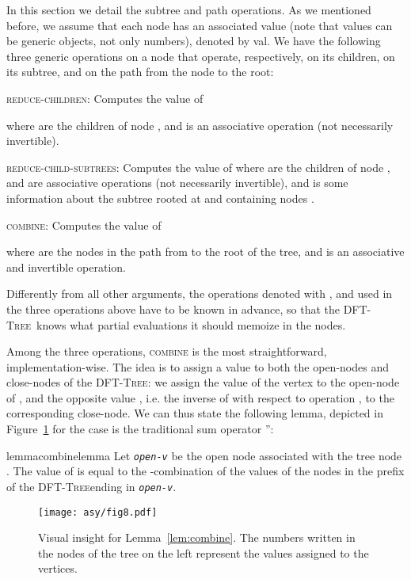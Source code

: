 \documentclass[a4paper,USenglish]{lipics}
\newcommand{\var}[1]{\textrm{\texttt{#1}}}
\newcommand{\dft}{\textsc{DFT-Tree}}
\begin{document}
In this section we detail the subtree and path operations. As we mentioned before, we assume that each node  has an associated value (note that values can be generic objects, not only numbers), denoted by \textrm{val}. We have the following three generic operations on a node that operate, respectively, on its children, on its subtree, and on the path from the node to the root:
		\begin{compactitem}
			\item \textsc{reduce-children}: Computes the value of 
			
			where  are the children of node , and  is an associative operation (not necessarily invertible).
			\item \textsc{reduce-child-subtrees}: Computes the value of 
			where  are the children of node ,  and  are associative operations (not necessarily invertible), and  is some information about the subtree rooted at  and containing nodes .
			\item \textsc{combine}: Computes the value of
			
			where  are the nodes in the path from  to the root of the tree, and  is an associative and invertible operation.
		\end{compactitem}
Differently from all other arguments, the operations denoted with ,  and  used in the three operations above have to be known in advance, so that the \dft\ knows what partial evaluations it should memoize in the nodes.

Among the three operations, \textsc{combine} is the most straightforward, implementation-wise. The idea is to assign a value to both the open-nodes and close-nodes of the \dft: we assign the value of the vertex  to the open-node of , and the opposite value , i.e. the inverse of  with respect to operation , to the corresponding close-node. We can thus state the following lemma, depicted in Figure~\ref{fig:combine} for the case  is the traditional sum operator '':

			\begin{restatable}{lemma}{combinelemma}
				\label{lem:combine}
Let \emph{\var{open-v}} be the open node associated with the tree node . The value of 
				is equal to the -combination of the values of the nodes in the prefix of the \dft ending in \emph{\var{open-v}}.
			\end{restatable}


\begin{figure}[t]
\centering\texttt{[image: asy/fig8.pdf]}
\caption{Visual insight for Lemma~\ref{lem:combine}. The numbers written in the nodes of the tree on the left represent the values assigned to the vertices.\label{fig:combine}}
\end{figure}
		
\end{document}
